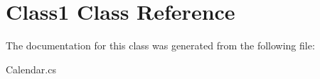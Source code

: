 \hypertarget{class_class1}{\section{Class1 Class Reference}
\label{class_class1}
}


The documentation for this class was generated from the following file\+:\begin{DoxyCompactItemize}
\item 
Calendar.\+cs\end{DoxyCompactItemize}
